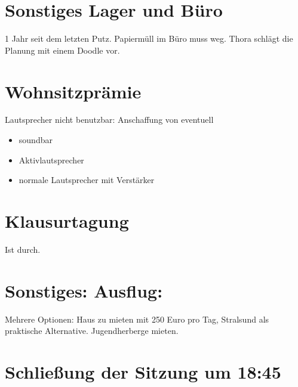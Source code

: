 \documentclass[]{article}
\begin{document}
\section{Sonstiges Lager und Büro}
1 Jahr seit dem letzten Putz. Papiermüll im Büro muss weg. Thora schlägt die Planung mit einem Doodle vor.

\section{Wohnsitzprämie}
Lautsprecher nicht benutzbar: Anschaffung von eventuell
\begin{itemize}
	\item soundbar
	\item Aktivlautsprecher
	\item normale Lautsprecher mit Verstärker
\end{itemize}
\section{Klausurtagung}
Ist durch.
\section{Sonstiges: Ausflug:}
Mehrere Optionen: Haus zu mieten mit 250 Euro pro Tag, Stralsund als praktische Alternative. Jugendherberge mieten.

\section{Schließung der Sitzung um 18:45}
\end{document}
